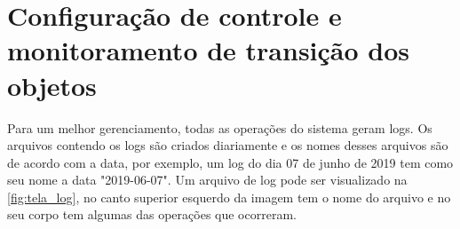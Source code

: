 

\section{Configuração de controle e monitoramento de transição dos objetos}


\par 
Para um melhor gerenciamento, todas as operações do sistema geram logs. Os arquivos contendo os logs são criados diariamente e os nomes desses arquivos são de acordo com a data, por exemplo, um log do dia 07 de junho de 2019 tem como seu nome a data "2019-06-07". Um arquivo de log pode ser visualizado na \autoref{fig:tela_log}, no canto superior esquerdo da imagem tem o nome do arquivo e no seu corpo tem algumas das operações que ocorreram.


